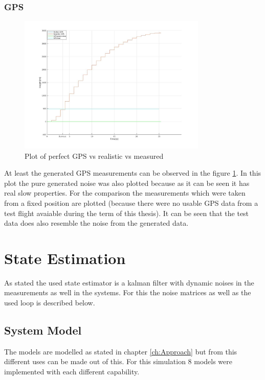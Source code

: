 \subsubsection{GPS}
\begin{figure}[h!]
 \centering
 \includegraphics[width=0.8\textwidth]{./Pictures/GPSPerfVSReal.jpg}
 \caption{Plot of perfect GPS vs realistic vs measured}
 \label{fig:GPSPerfVSReal}
\end{figure}
At least the generated GPS measurements can be observed in the figure \ref{fig:GPSPerfVSReal}.
In this plot the pure generated noise was also plotted because as it can be seen it has real slow properties.
For the comparison the measurements which were taken from a fixed position are plotted (because there were no usable GPS data from a test flight avaiable during the term of this thesis).
It can be seen that the test data does also resemble the noise from the generated data.

\section{State Estimation}
As stated the used state estimator is a kalman filter with dynamic noises in the measurements as well in the systems.
For this the noise matrices as well as the used loop is described below.

\subsection{System Model}
The models are modelled as stated in chapter \ref{ch:Approach} but from this different uses can be made out of this.
For this simulation 8 models were implemented with each different capability.

